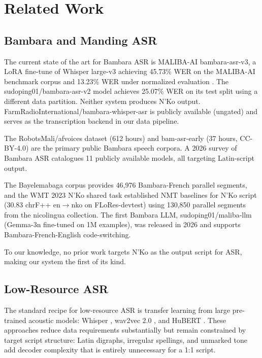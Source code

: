 \documentclass[11pt]{article}
\begin{document}
\section{Related Work}

\subsection{Bambara and Manding ASR}

The current state of the art for Bambara ASR is MALIBA-AI bambara-asr-v3, a LoRA fine-tune of Whisper large-v3 achieving 45.73\% WER on the MALIBA-AI benchmark corpus and 13.23\% WER under normalized evaluation \cite{maliba2024bambara}.
The sudoping01/bambara-asr-v2 model achieves 25.07\% WER on its test split using a different data partition.
Neither system produces N'Ko output.
FarmRadioInternational/bambara-whisper-asr is publicly available (ungated) and serves as the transcription backend in our data pipeline.

The RobotsMali/afvoices dataset (612 hours) and bam-asr-early (37 hours, CC-BY-4.0) are the primary public Bambara speech corpora.
A 2026 survey of Bambara ASR \cite{bambara_survey_2026} catalogues 11 publicly available models, all targeting Latin-script output.

The Bayelemabaga corpus \cite{bayelemabaga2025} provides 46,976 Bambara-French parallel segments, and the WMT 2023 N'Ko shared task \cite{wmt2023nko} established NMT baselines for N'Ko script (30.83 chrF++ en$\to$nko on FLoRes-devtest) using 130,850 parallel segments from the nicolingua collection.
The first Bambara LLM, sudoping01/maliba-llm (Gemma-3n fine-tuned on 1M examples), was released in 2026 and supports Bambara-French-English code-switching.

To our knowledge, no prior work targets N'Ko as the output script for ASR, making our system the first of its kind.

\subsection{Low-Resource ASR}

The standard recipe for low-resource ASR is transfer learning from large pre-trained acoustic models: Whisper \cite{radford2023robust}, wav2vec 2.0 \cite{baevski2020wav2vec}, and HuBERT \cite{hsu2021hubert}.
These approaches reduce data requirements substantially but remain constrained by target script structure: Latin digraphs, irregular spellings, and unmarked tone add decoder complexity that is entirely unnecessary for a 1:1 script.
\end{document}
